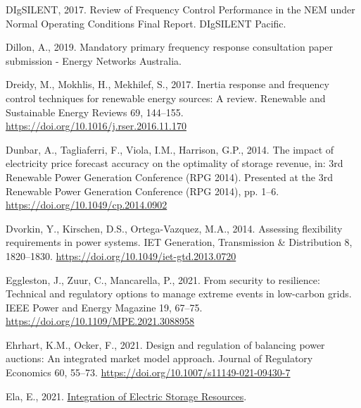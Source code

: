 \documentclass[12pt,a4paper,]{report}
\newlength{\cslhangindent}
\newenvironment{CSLReferences}[2] %
 {%
  \setlength{\parindent}{0pt}
  \ifodd #1 \everypar{\setlength{\hangindent}{\cslhangindent}}\ignorespaces\fi
  \ifnum #2 > 0
  \setlength{\parskip}{#2\baselineskip}
  \fi
 }%
 {}
\begin{document}
\begin{CSLReferences}{1}{0}
\leavevmode{}%
DIgSILENT, 2017. Review of {Frequency Control Performance} in the {NEM}
under {Normal Operating Conditions Final Report}. DIgSILENT Pacific.

\leavevmode{}%
Dillon, A., 2019. Mandatory primary frequency response consultation
paper submission - {Energy Networks Australia}.

\leavevmode{}%
Dreidy, M., Mokhlis, H., Mekhilef, S., 2017. Inertia response and
frequency control techniques for renewable energy sources: {A} review.
Renewable and Sustainable Energy Reviews 69, 144--155.
\url{https://doi.org/10.1016/j.rser.2016.11.170}

\leavevmode{}%
Dunbar, A., Tagliaferri, F., Viola, I.M., Harrison, G.P., 2014. The
impact of electricity price forecast accuracy on the optimality of
storage revenue, in: 3rd {Renewable Power Generation Conference} ({RPG}
2014). Presented at the 3rd {Renewable Power Generation Conference}
({RPG} 2014), pp. 1--6. \url{https://doi.org/10.1049/cp.2014.0902}

\leavevmode{}%
Dvorkin, Y., Kirschen, D.S., Ortega-Vazquez, M.A., 2014. Assessing
flexibility requirements in power systems. IET Generation, Transmission
\& Distribution 8, 1820--1830.
\url{https://doi.org/10.1049/iet-gtd.2013.0720}

\leavevmode{}%
Eggleston, J., Zuur, C., Mancarella, P., 2021. From security to
resilience: {Technical} and regulatory options to manage extreme events
in low-carbon grids. IEEE Power and Energy Magazine 19, 67--75.
\url{https://doi.org/10.1109/MPE.2021.3088958}

\leavevmode{}%
Ehrhart, K.M., Ocker, F., 2021. Design and regulation of balancing power
auctions: An integrated market model approach. Journal of Regulatory
Economics 60, 55--73. \url{https://doi.org/10.1007/s11149-021-09430-7}

\leavevmode{}%
Ela, E., 2021.
\href{https://www.energy.gov/sites/prod/files/2021/02/f82/Energy\%20Storage_Ela_EPRI_0.pdf}{Integration
of {Electric Storage Resources}}.


\end{CSLReferences}
\end{document}
